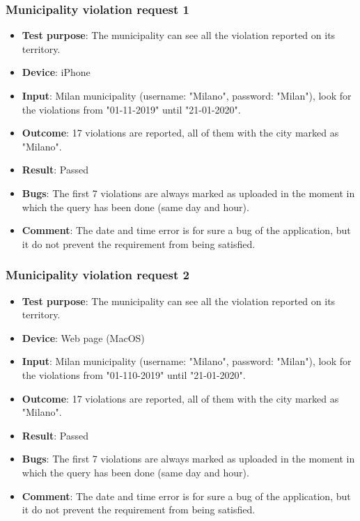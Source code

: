 \documentclass[../ATD.tex]{subfiles}
\begin{document}
    \subsubsection{Municipality violation request 1}\label{subsubsec:municiplaity-violation-request-1}
    \begin{itemize}
        \item \textbf{Test purpose}: The municipality can see all the violation reported on its territory.
        \item \textbf{Device}: iPhone
        \item \textbf{Input}: Milan municipality (username: "Milano", password: "Milan"), look for the violations from "01-11-2019" until "21-01-2020".
        \item \textbf{Outcome}: 17 violations are reported, all of them with the city marked as "Milano".
        \item \textbf{Result}: Passed
        \item \textbf{Bugs}: The first 7 violations are always marked as uploaded in the moment in which the query has been done (same day and hour).
        \item \textbf{Comment}: The date and time error is for sure a bug of the application, but it do not prevent the requirement from being satisfied.
    \end{itemize}

    \subsubsection{Municipality violation request 2}\label{subsubsec:municiplaity-violation-request-2}
    \begin{itemize}
        \item \textbf{Test purpose}: The municipality can see all the violation reported on its territory.
        \item \textbf{Device}: Web page (MacOS)
        \item \textbf{Input}: Milan municipality (username: "Milano", password: "Milan"), look for the violations from "01-110-2019" until "21-01-2020".
        \item \textbf{Outcome}: 17 violations are reported, all of them with the city marked as "Milano".
        \item \textbf{Result}: Passed
        \item \textbf{Bugs}: The first 7 violations are always marked as uploaded in the moment in which the query has been done (same day and hour).
        \item \textbf{Comment}: The date and time error is for sure a bug of the application, but it do not prevent the requirement from being satisfied.
    \end{itemize}
\end{document}
